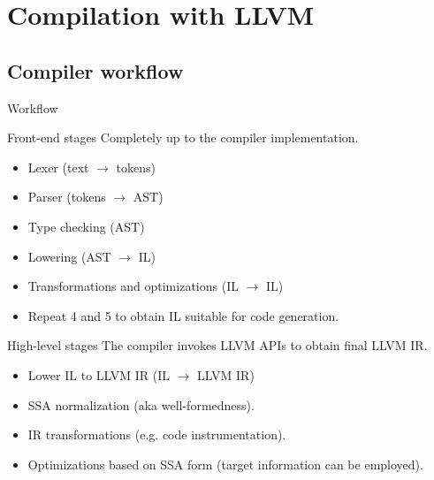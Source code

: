 \documentclass[8pt]{beamer}
\begin{document}
\section[Compilation]{Compilation with LLVM}
\subsection*{Compiler workflow}

\begin{frame}{Workflow}
  \begin{block}{Front-end stages}
    Completely up to the compiler implementation.
    \begin{itemize}
      \item Lexer (text $\rightarrow$ tokens)
      \item Parser (tokens $\rightarrow$ AST)
      \item Type checking (AST)
      \item Lowering (AST $\rightarrow$ IL)
      \item Transformations and optimizations (IL $\rightarrow$ IL)
      \item Repeat 4 and 5 to obtain IL suitable for code generation.
    \end{itemize}
  \end{block}
  
  \begin{block}{High-level stages}
    The compiler invokes LLVM APIs to obtain final LLVM IR.
    \begin{itemize}
      \item Lower IL to LLVM IR (IL $\rightarrow$ LLVM IR)
      \item SSA normalization (aka well-formedness).
      \item IR transformations (e.g. code instrumentation).
      \item Optimizations based on SSA form (target information can be
        employed).
    \end{itemize}
  \end{block}
\end{frame}
\end{document}
